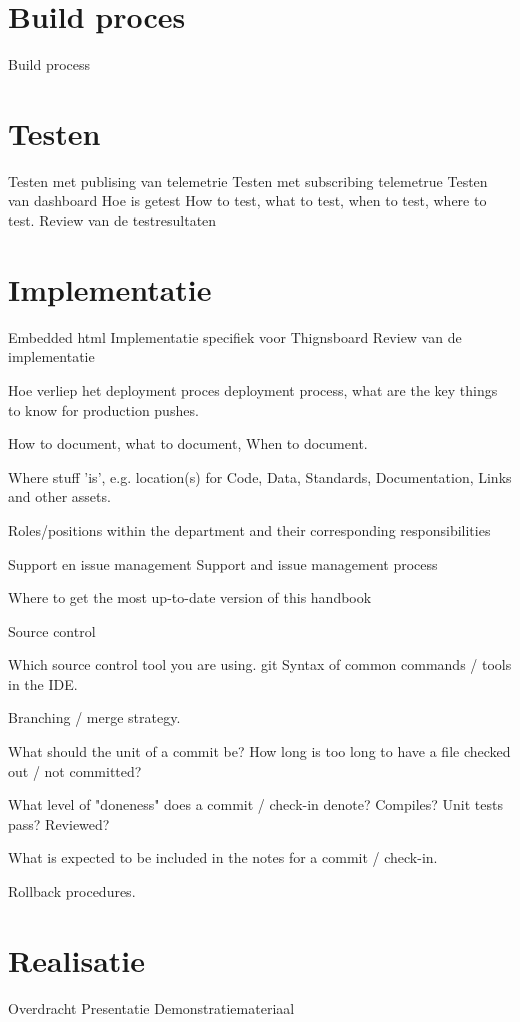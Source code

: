 		\section{Build proces}
		Build process
		
		
		\section{Testen}
		
		Testen met publising van telemetrie
		Testen met subscribing telemetrue
		Testen van dashboard
		Hoe is getest
		How to test, what to test, when to test, where to test.
		Review van de testresultaten
		
		\section{Implementatie}
		Embedded html
		Implementatie specifiek voor Thignsboard
		Review van de implementatie
		
		Hoe verliep het deployment proces
		deployment process, what are the key things to know for production pushes.
		
		How to document, what to document, When to document.
		
		Where stuff 'is', e.g. location(s) for Code, Data, Standards, Documentation, Links and other assets.
		
		
		
		Roles/positions within the department and their corresponding responsibilities
		
		Support en issue management
		Support and issue management process
		
		Where to get the most up-to-date version of this handbook
		
		Source control
		
		Which source control tool you are using.
		git
		Syntax of common commands / tools in the IDE.
		
		Branching / merge strategy.
		
		What should the unit of a commit be? How long is too long to have a file checked out / not committed?
		
		What level of "doneness" does a commit / check-in denote? Compiles? Unit tests pass? Reviewed?
		
		What is expected to be included in the notes for a commit / check-in.
		
		Rollback procedures.
		
		
		\section{Realisatie}
		Overdracht
		Presentatie
		Demonstratiemateriaal
		
